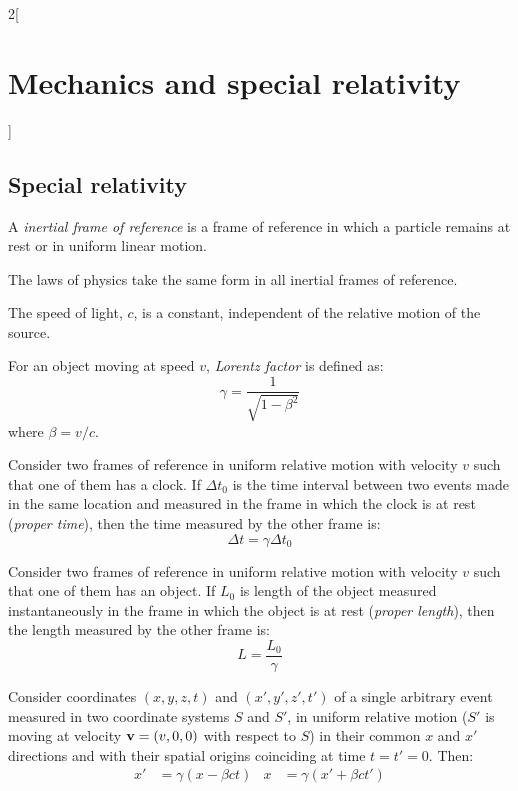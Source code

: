\documentclass[../../../main.tex]{subfiles}
\begin{document}
\begin{multicols}{2}[\section{Mechanics and special relativity}]
  \subsection{Special relativity}
  \begin{definition}
    A \textit{inertial frame of reference} is a frame of reference in which a particle remains at rest or in uniform linear motion.
  \end{definition}
  \begin{principle}
    The laws of physics take the same form in all inertial frames of reference.
  \end{principle}
  \begin{principle}
    The speed of light, $c$, is a constant, independent of the relative motion of the source.
  \end{principle}
  \begin{definition}
    For an object moving at speed $v$, \textit{Lorentz factor} is defined as:
    $$\gamma=\frac{1}{\sqrt{1-\beta^2}}$$ where $\beta=v/c$.
  \end{definition}
  \begin{prop}
    Consider two frames of reference in uniform relative motion with velocity $v$ such that one of them has a clock. If $\Delta t_0$ is the time interval between two events made in the same location and measured in the frame in which the clock is at rest (\textit{proper time}), then the time measured by the other frame is:
    $$\Delta t=\gamma\Delta t_0$$
  \end{prop}
  \begin{prop}
    Consider two frames of reference in uniform relative motion with velocity $v$ such that one of them has an object. If $L_0$ is length of the object measured instantaneously in the frame in which the object is at rest (\textit{proper length}), then the length measured by the other frame is:
    $$L=\frac{L_0}{\gamma}$$
  \end{prop}
  \begin{prop}
    Consider coordinates $(x,y,z,t)$ and $(x',y',z',t')$ of a single arbitrary event measured in two coordinate systems $S$ and $S'$, in uniform relative motion ($S'$ is moving at velocity $\boldsymbol{\mathrm{v}}=(v,0,0)$ with respect to $S$) in their common $x$ and $x'$ directions and  with their spatial origins coinciding at time $t=t'=0$. Then:
    \begin{align*}
      x'  & =\gamma(x-\beta ct) & x  & =\gamma(x'+\beta ct') \\

\end{align*}
\end{prop}
\end{multicols}
\end{document}
